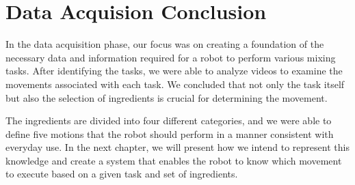 \section*{Data Acquision Conclusion}

In the data acquisition phase, our focus was on creating a foundation of the necessary data and information required for a robot to perform various mixing tasks. After identifying the tasks, we were able to analyze videos to examine the movements associated with each task. We concluded that not only the task itself but also the selection of ingredients is crucial for determining the movement.

The ingredients are divided into four different categories, and we were able to define five motions that the robot should perform in a manner consistent with everyday use. In the next chapter, we will present how we intend to represent this knowledge and create a system that enables the robot to know which movement to execute based on a given task and set of ingredients.
\newpage